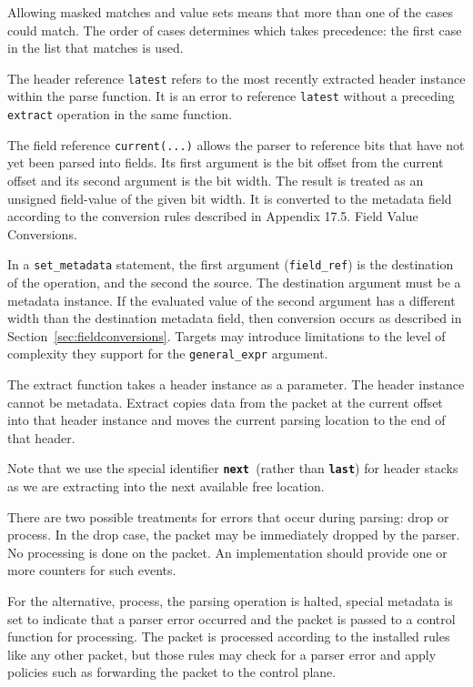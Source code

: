 \documentclass[12pt]{article}
\begin{document}
Allowing masked matches and value sets means that more than one of the cases 
could match. The order of cases determines which takes precedence: the first 
case in the list that matches is used.

The header reference \texttt{latest} refers to the most recently extracted header 
instance within the parse function.  It is an error to reference \texttt{latest} without 
a preceding \texttt{extract} operation in the same function.

The field reference \texttt{current(...)} allows the parser to reference bits that 
have not yet been parsed into fields. Its first argument is the bit offset 
from the current offset and its second argument is the bit width.  The result 
is treated as an unsigned field-value of the given bit width. It is converted 
to the metadata field according to the conversion rules described in Appendix 
17.5. Field Value Conversions.

In a \texttt{set_metadata} statement, the first argument (\texttt{field_ref}) 
is the destination of the operation, and the second the source. The destination 
argument must be a metadata instance. If the evaluated value of the second argument 
has a different width than the destination metadata field, then conversion occurs 
as described in Section~\ref{sec:fieldconversions}. Targets may introduce 
limitations to the level of complexity they support for the \texttt{general_expr} 
argument.


The extract function takes a header instance as a parameter.  The header instance 
cannot be metadata. Extract copies data from the packet at the current offset 
into that header instance and moves the current parsing location to the end 
of that header.

Note that we use the special identifier \texttt{\textbf{next} }(rather than 
\texttt{\textbf{last}}) for header stacks as we are extracting into the next available 
free location. 


There are two possible treatments for errors that occur during parsing: drop 
or process. In the drop case, the packet may be immediately dropped by the 
parser. No \matchaction processing is done on the packet. An implementation 
should provide one or more counters for such events.

For the alternative, process, the parsing operation is halted, special metadata 
is set to indicate that a parser error occurred and the packet is passed to 
a control function for \matchaction processing. The packet is processed according 
to the installed \matchaction rules like any other packet, but those rules 
may check for a parser error and apply policies such as forwarding the packet 
to the control plane.
\end{document}
